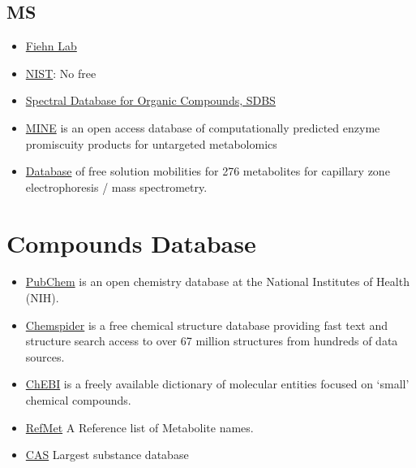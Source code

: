 \documentclass[
]{book}
\begin{document}
\hypertarget{ms}{%
\subsection{MS}\label{ms}}

\begin{itemize}
\item
  \href{http://fiehnlab.ucdavis.edu/projects/binbase-setup}{Fiehn Lab}
\item
  \href{https://www.nist.gov/srd/nist-standard-reference-database-1a-v17}{NIST}: No free
\item
  \href{https://sdbs.db.aist.go.jp/sdbs/cgi-bin/cre_index.cgi?lang=eng}{Spectral Database for Organic Compounds, SDBS}
\item
  \href{http://minedatabase.mcs.anl.gov/\#/faq}{MINE} is an open access database of computationally predicted enzyme promiscuity products for untargeted metabolomics
\item
  \href{https://www.sciencedirect.com/science/article/abs/pii/S0039914019311786?via\%3Dihub}{Database} of free solution mobilities for 276 metabolites for capillary zone electrophoresis / mass spectrometry. \citep{petrov2020}
\end{itemize}

\hypertarget{compounds-database}{%
\section{Compounds Database}\label{compounds-database}}

\begin{itemize}
\item
  \href{https://pubchem.ncbi.nlm.nih.gov/}{PubChem} is an open chemistry database at the National Institutes of Health (NIH).
\item
  \href{http://www.chemspider.com/}{Chemspider} is a free chemical structure database providing fast text and structure search access to over 67 million structures from hundreds of data sources.
\item
  \href{https://www.ebi.ac.uk/chebi/}{ChEBI} is a freely available dictionary of molecular entities focused on `small' chemical compounds.
\item
  \href{http://www.metabolomicsworkbench.org/databases/refmet/index.php}{RefMet} A Reference list of Metabolite names.
\item
  \href{https://www.cas.org/support/documentation/chemical-substances/cas-registry-100-millionth-fun-facts}{CAS} Largest substance database
\end{itemize}
\end{document}
